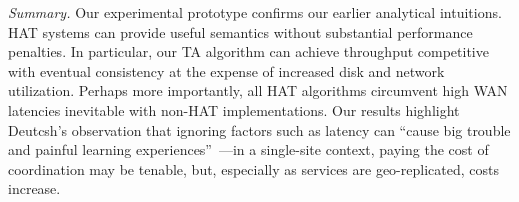 \vspace{.5em}\noindent\textit{Summary.} Our experimental prototype
confirms our earlier analytical intuitions. HAT systems can provide
useful semantics without substantial performance penalties. In
particular, our TA algorithm can achieve throughput competitive with
eventual consistency at the expense of increased disk and network
utilization. Perhaps more importantly, all HAT algorithms circumvent
high WAN latencies inevitable with non-HAT implementations. Our results
highlight Deutcsh's observation that ignoring factors such as latency
can ``cause big trouble and painful learning
experiences''~\cite{fallacies-deutsch}---in a single-site context,
paying the cost of coordination may be tenable, but, especially as
services are geo-replicated, costs increase.
